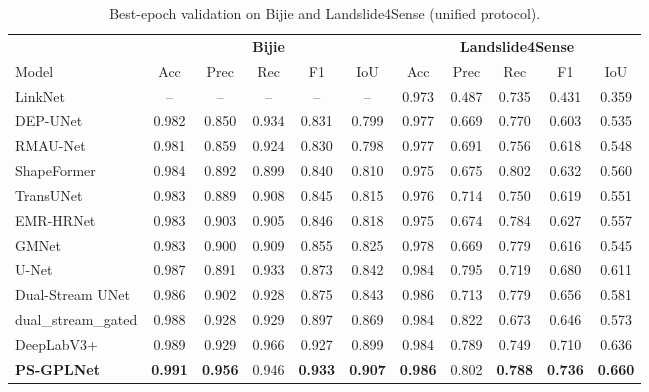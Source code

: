 \documentclass[10pt,twocolumn,letterpaper]{article}
\begin{document}
\begin{table}[!t]
\centering
\caption{Best-epoch validation on Bijie and Landslide4Sense (unified protocol).}
\label{tab:results}
\setlength{\tabcolsep}{4.5pt}
\small
\begin{tabular}{l ccccc | ccccc}
\toprule
& \multicolumn{5}{c|}{\textbf{Bijie}} & \multicolumn{5}{c}{\textbf{Landslide4Sense}} \\
\cmidrule(lr){2-6} \cmidrule(l){7-11}
Model & Acc & Prec & Rec & F1 & IoU & Acc & Prec & Rec & F1 & IoU \\
\midrule
LinkNet & -- & -- & -- & -- & -- & 0.973 & 0.487 & 0.735 & 0.431 & 0.359 \\
DEP-UNet & 0.982 & 0.850 & 0.934 & 0.831 & 0.799 & 0.977 & 0.669 & 0.770 & 0.603 & 0.535 \\
RMAU-Net & 0.981 & 0.859 & 0.924 & 0.830 & 0.798 & 0.977 & 0.691 & 0.756 & 0.618 & 0.548 \\
ShapeFormer & 0.984 & 0.892 & 0.899 & 0.840 & 0.810 & 0.975 & 0.675 & 0.802 & 0.632 & 0.560 \\
TransUNet & 0.983 & 0.889 & 0.908 & 0.845 & 0.815 & 0.976 & 0.714 & 0.750 & 0.619 & 0.551 \\
EMR-HRNet & 0.983 & 0.903 & 0.905 & 0.846 & 0.818 & 0.975 & 0.674 & 0.784 & 0.627 & 0.557 \\
GMNet & 0.983 & 0.900 & 0.909 & 0.855 & 0.825 & 0.978 & 0.669 & 0.779 & 0.616 & 0.545 \\
U-Net & 0.987 & 0.891 & 0.933 & 0.873 & 0.842 & 0.984 & 0.795 & 0.719 & 0.680 & 0.611 \\
Dual-Stream UNet & 0.986 & 0.902 & 0.928 & 0.875 & 0.843 & 0.986 & 0.713 & 0.779 & 0.656 & 0.581 \\
dual\_stream\_gated & 0.988 & 0.928 & 0.929 & 0.897 & 0.869 & 0.984 & 0.822 & 0.673 & 0.646 & 0.573 \\
DeepLabV3+ & 0.989 & 0.929 & 0.966 & 0.927 & 0.899 & 0.984 & 0.789 & 0.749 & 0.710 & 0.636 \\
\midrule
\textbf{PS-GPLNet} & \textbf{0.991} & \textbf{0.956} & 0.946 & \textbf{0.933} & \textbf{0.907} & \textbf{0.986} & 0.802 & \textbf{0.788} & \textbf{0.736} & \textbf{0.660} \\
\bottomrule
\end{tabular}
\end{table}
\end{document}
